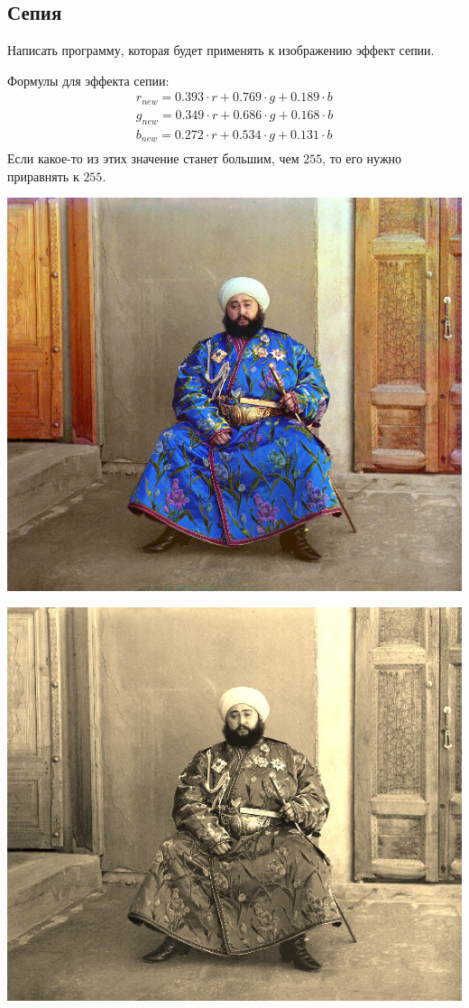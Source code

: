 \documentclass{article}
\begin{document}
\subsection{Сепия} 
Написать программу, которая будет применять к изображению эффект сепии.
\begin{multicols}{3}
Формулы для эффекта сепии:
\begin{align*}
r_{new} = 0.393 \cdot r + 0.769 \cdot g + 0.189 \cdot b\\
g_{new} = 0.349 \cdot r + 0.686 \cdot g + 0.168 \cdot b\\
b_{new} = 0.272 \cdot r + 0.534 \cdot g + 0.131 \cdot b\\
\end{align*}
Если какое-то из этих значение станет большим, чем $255$, то его нужно приравнять к $255$.
\vfill			
\begin{center}
\includegraphics[scale=0.26]{../images/imageproc.jpg}
\end{center}
\vfill			
\begin{center}
\includegraphics[scale=0.26]{../images/imageproc_sepia.jpg}

\end{center}
\end{multicols}
\end{document}
